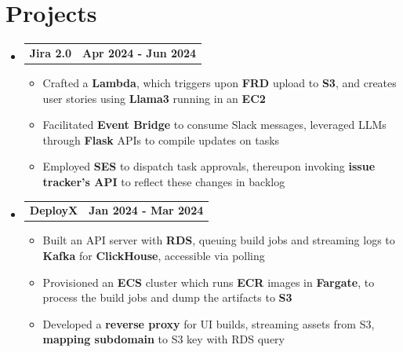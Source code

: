 \documentclass[letterpaper,11pt]{article}
\makeatletter
\newcommand{\resumeItem}[1]{
  \item\small{
    {#1 \vspace{-2pt}}
  }
}
\newcommand{\resumeProjectHeading}[2]{
    \item
    \begin{tabular*}{1.0\textwidth}{l@{\extracolsep{\fill}}r}
      \textbf{#1} & \textbf{\small #2} \\
    \end{tabular*}\vspace{-7pt}
}
\newcommand{\resumeSubHeadingListStart}{\begin{itemize}[leftmargin=0.0in, label={}]}
\newcommand{\resumeSubHeadingListEnd}{\end{itemize}}
\newcommand{\resumeItemListStart}{\begin{itemize}}
\newcommand{\resumeItemListEnd}{\end{itemize}\vspace{-5pt}}
\makeatother
\begin{document}
\section{Projects}
  \resumeSubHeadingListStart

    \resumeProjectHeading
      {Jira 2.0}{Apr 2024 - Jun 2024}
      \resumeItemListStart
        \resumeItem{Crafted a \textbf{Lambda}, which triggers upon \textbf{FRD} upload to \textbf{S3}, and creates user stories using \textbf{Llama3} running in an \textbf{EC2}}
        \resumeItem{Facilitated \textbf{Event Bridge} to consume Slack messages, leveraged LLMs through \textbf{Flask} APIs to compile updates on tasks}
        \resumeItem{Employed \textbf{SES} to dispatch task approvals, thereupon invoking \textbf{issue tracker's API} to reflect these changes in backlog}
      \resumeItemListEnd

    \resumeProjectHeading
      {DeployX}{Jan 2024 - Mar 2024}
      \resumeItemListStart
        \resumeItem{Built an API server with \textbf{RDS}, queuing build jobs and streaming logs to \textbf{Kafka} for \textbf{ClickHouse}, accessible via polling}
        \resumeItem{Provisioned an \textbf{ECS} cluster which runs \textbf{ECR} images in \textbf{Fargate}, to process the build jobs and dump the artifacts to \textbf{S3}}
        \resumeItem{Developed a \textbf{reverse proxy} for UI builds, streaming assets from S3, \textbf{mapping subdomain} to S3 key with RDS query}
      \resumeItemListEnd
    
  \resumeSubHeadingListEnd
\vspace{-16pt}
\end{document}
